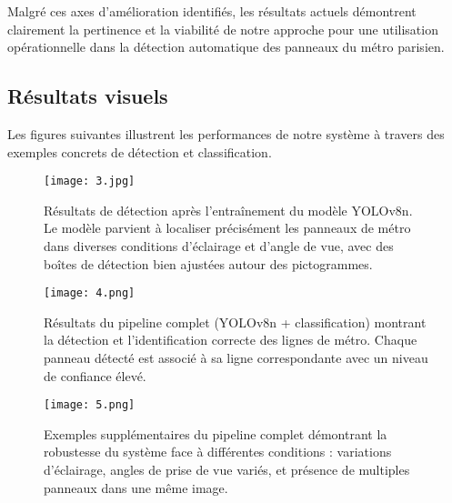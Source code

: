 \documentclass[journal]{IEEEtran}
\begin{document}
Malgré ces axes d'amélioration identifiés, les résultats actuels démontrent clairement la pertinence et la viabilité de notre approche pour une utilisation opérationnelle dans la détection automatique des panneaux du métro parisien.

\subsection{Résultats visuels}
Les figures suivantes illustrent les performances de notre système à travers des exemples concrets de détection et classification.

\begin{figure}[H]
\centering
\texttt{[image: 3.jpg]}
\caption{Résultats de détection après l'entraînement du modèle YOLOv8n. Le modèle parvient à localiser précisément les panneaux de métro dans diverses conditions d'éclairage et d'angle de vue, avec des boîtes de détection bien ajustées autour des pictogrammes.}
\label{fig:yolo_results}
\end{figure}

\begin{figure}[H]
\centering
\texttt{[image: 4.png]}
\caption{Résultats du pipeline complet (YOLOv8n + classification) montrant la détection et l'identification correcte des lignes de métro. Chaque panneau détecté est associé à sa ligne correspondante avec un niveau de confiance élevé.}
\label{fig:pipeline_results_1}
\end{figure}

\begin{figure}[H]
\centering
\texttt{[image: 5.png]}
\caption{Exemples supplémentaires du pipeline complet démontrant la robustesse du système face à différentes conditions : variations d'éclairage, angles de prise de vue variés, et présence de multiples panneaux dans une même image.}
\label{fig:pipeline_results_2}
\end{figure}


%
%
%
\end{document}
